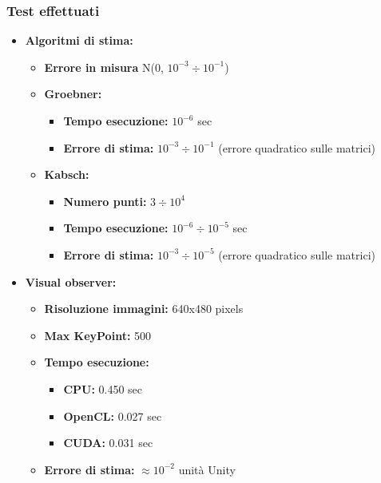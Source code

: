 \documentclass{beamer}
\begin{document}
\begin{frame}
\frametitle{Test effettuati}
\begin{itemize}
	\item \textbf{Algoritmi di stima:}
	\begin{itemize}
		\item \textbf{Errore in misura} N(0, $10^{-3} \div 10^{-1}$)
		\item \textbf{Groebner:}
			\begin{itemize}
				\item \textbf{Tempo esecuzione:} $10^{-6}$ sec
				\item \textbf{Errore di stima:} \hspace{10pt} $10^{-3} \div 10^{-1}$ (errore quadratico sulle matrici)
			\end{itemize} 
		\item \textbf{Kabsch:}
		\begin{itemize}
			\item \textbf{Numero punti:} \hspace{28pt} $3 \div 10^{4}$ 
			\item \textbf{Tempo esecuzione:} $10^{-6} \div 10^{-5}$ sec
			\item \textbf{Errore di stima:} \hspace{10pt} $10^{-3} \div 10^{-5}$ (errore quadratico sulle matrici)
		\end{itemize} 
	\end{itemize}		
	\item \textbf{Visual observer:}
	\begin{itemize}
		\item \textbf{Risoluzione immagini:} 640x480 pixels
		\item \textbf{Max KeyPoint:} 500
		\item \textbf{Tempo esecuzione:}
		\begin{itemize}
			\item \textbf{CPU:}  \hspace{11pt}  0.450 sec
			\item \textbf{OpenCL:} 0.027 sec
			\item \textbf{CUDA:} \hspace{4pt} 0.031 sec
		\end{itemize}
		\item \textbf{Errore di stima:} $\approx 10^{-2}$ unità Unity
	\end{itemize} 		
	
\end{itemize}
\end{frame}
\end{document}

